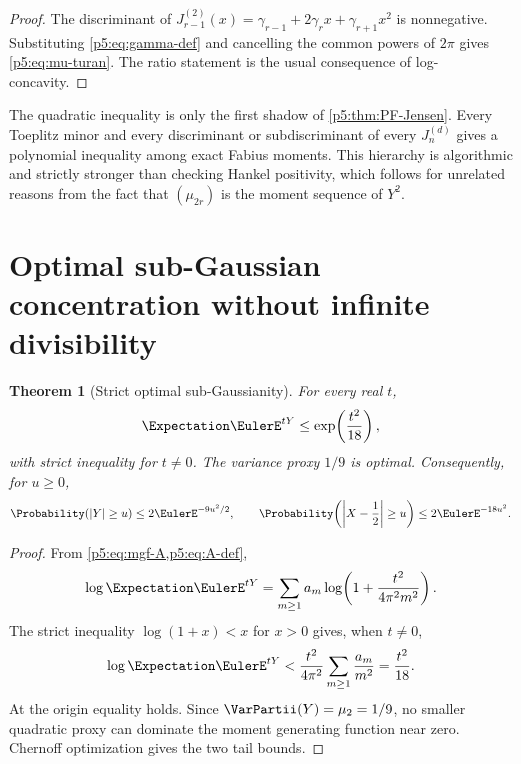 \documentclass[11pt]{article}
\numberwithin{equation}{section}
\newtheorem{theorem}{Theorem}[section]
\theoremstyle{definition}
\theoremstyle{remark}
\begin{document}
\begin{proof}
The discriminant of
$J_{r-1}^{(2)}(x)=\gamma_{r-1}+2\gamma_rx+\gamma_{r+1}x^2$
is nonnegative.  Substituting \cref{p5:eq:gamma-def} and cancelling the common
powers of $2\pi$ gives \cref{p5:eq:mu-turan}.  The ratio statement is the usual
consequence of log-concavity.
\end{proof}

\begin{remark}
The quadratic inequality is only the first shadow of
\cref{p5:thm:PF-Jensen}.  Every Toeplitz minor and every discriminant or subdiscriminant
of every $J_n^{(d)}$ gives a polynomial inequality among exact Fabius moments.
This hierarchy is algorithmic and strictly stronger than checking Hankel
positivity, which follows for unrelated reasons from the fact that
$(\mu_{2r})$ is the moment sequence of $Y^2$.
\end{remark}

\section{Optimal sub-Gaussian concentration without infinite divisibility}

\begin{theorem}[Strict optimal sub-Gaussianity]\label{p5:thm:subgaussian}
For every real $t$,
\begin{equation}\label{p5:eq:subgaussian}
 \Expectation\EulerE^{tY}\le\exp\!\left(\frac{t^2}{18}\right),
\end{equation}
with strict inequality for $t\ne0$.  The variance proxy $1/9$ is optimal.
Consequently, for $u\ge0$,
\begin{equation}\label{p5:eq:tails-YX}
 \Probability(|Y|\ge u)\le2\EulerE^{-9u^2/2},\qquad
 \Probability\!\left(\left|X-\frac12\right|\ge u\right)
 \le2\EulerE^{-18u^2}.
\end{equation}
\end{theorem}

\begin{proof}
From \cref{p5:eq:mgf-A,p5:eq:A-def},
\[
 \log\Expectation\EulerE^{tY}
 =\sum_{m\ge1}a_m
 \log\!\left(1+\frac{t^2}{4\pi^2m^2}\right).
\]
The strict inequality $\log(1+x)<x$ for $x>0$ gives, when $t\ne0$,
\[
 \log\Expectation\EulerE^{tY}<\frac{t^2}{4\pi^2}
 \sum_{m\ge1}\frac{a_m}{m^2}
 =\frac{t^2}{18}.
\]
At the origin equality holds.  Since $\VarPartii(Y)=\mu_2=1/9$, no smaller
quadratic proxy can dominate the moment generating function near zero.
Chernoff optimization gives the two tail bounds.
\end{proof}
\end{document}
